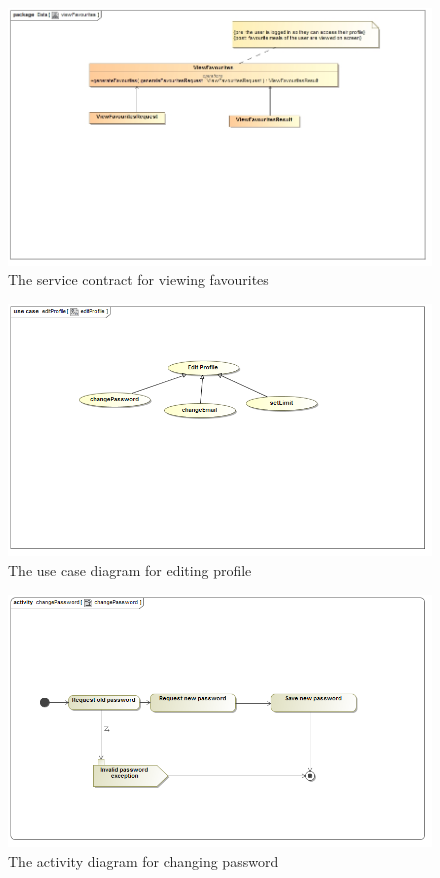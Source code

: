 \documentclass[a4paper,12pt]{article}
\begin{document}
\begin{figure}[H]
	\centering
	\includegraphics[width=1.0\textwidth]{images/viewFavouritesSC.jpg}
	\caption{The service contract for viewing favourites}
\end{figure}

\begin{figure}[H]
  \centering
    \includegraphics[width=1.0\textwidth]{images/editProfile.png}
    \caption{The use case diagram for editing profile} 
\end{figure}

\begin{figure}[H]
  \centering
    \includegraphics[width=1.0\textwidth]{images/changePassword.png}
    \caption{The activity diagram for changing password } 
\end{figure}
	
\end{document}

